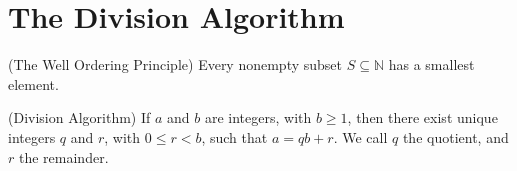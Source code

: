 \newpage

\section{The Division Algorithm} 

\begin{axiom}{(The Well Ordering Principle)}
Every nonempty subset $S \subseteq \mathbb{N}$ has a smallest element.
\end{axiom}

\begin{theorem}{(Division Algorithm)}
If $a$ and $b$ are integers, with $b \geq 1$, then there exist unique integers $q$ and $r$, with $0 \le r < b$, such that $a = qb + r$. 
We call $q$ the quotient, and $r$ the remainder.
\end{theorem}

